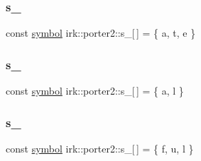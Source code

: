 \mbox{\label{namespaceirk_1_1porter2_aa1b116a1c17b8f5dd6c4ec852c2f4699}} 
\subsubsection{\texorpdfstring{s\+\_}{s\_15}}
{\footnotesize\ttfamily const \mbox{\hyperlink{namespaceirk_1_1porter2_afd04c4eb58a1dabcf8f3ab2d7e9f9ed5}{symbol}} irk\+::porter2\+::s\+\_\mbox{[}$\,$\mbox{]} = \{ \textquotesingle{}a\textquotesingle{}, \textquotesingle{}t\textquotesingle{}, \textquotesingle{}e\textquotesingle{} \}\hspace{0.3cm}{\ttfamily [static]}}

\mbox{\label{namespaceirk_1_1porter2_a76cf7ea33a137e766583bfbc691d3f47}} 
\subsubsection{\texorpdfstring{s\+\_}{s\_16}}
{\footnotesize\ttfamily const \mbox{\hyperlink{namespaceirk_1_1porter2_afd04c4eb58a1dabcf8f3ab2d7e9f9ed5}{symbol}} irk\+::porter2\+::s\+\_\mbox{[}$\,$\mbox{]} = \{ \textquotesingle{}a\textquotesingle{}, \textquotesingle{}l\textquotesingle{} \}\hspace{0.3cm}{\ttfamily [static]}}

\mbox{\label{namespaceirk_1_1porter2_a18ef3594115d8f544e309704259894f9}} 
\subsubsection{\texorpdfstring{s\+\_}{s\_17}}
{\footnotesize\ttfamily const \mbox{\hyperlink{namespaceirk_1_1porter2_afd04c4eb58a1dabcf8f3ab2d7e9f9ed5}{symbol}} irk\+::porter2\+::s\+\_\mbox{[}$\,$\mbox{]} = \{ \textquotesingle{}f\textquotesingle{}, \textquotesingle{}u\textquotesingle{}, \textquotesingle{}l\textquotesingle{} \}\hspace{0.3cm}{\ttfamily [static]}}

